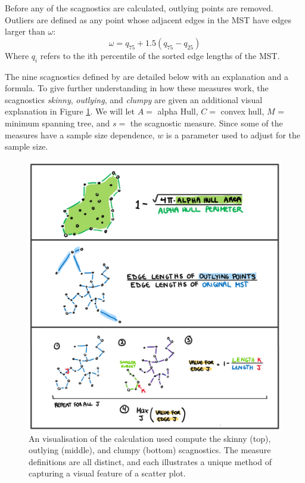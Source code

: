 Before any of the scagnostics are calculated, outlying points are
removed. Outliers are defined as any point whose adjacent edges in the
MST have edges larger than \(\omega\):
\[ \omega = q_{75} + 1.5(q_{75} - q_{25})\] Where \(q_i\) refers to the
ith percentile of the sorted edge lengths of the MST.

The nine scagnostics defined by \citet{scagdist} are detailed below with
an explanation and a formula. To give further understanding in how these
measures work, the scagnostics \emph{skinny}, \emph{outlying}, and
\emph{clumpy} are given an additional visual explanation in Figure
\ref{fig:scagdrawn}. We will let \(A=\) alpha Hull, \(C=\) convex hull,
\(M\) = minimum spanning tree, and \(s=\) the scagnostic measure. Since
some of the measures have a sample size dependence, \(w\) is a parameter
used to adjust for the sample size.

\begin{Schunk}
\begin{figure}
\includegraphics[width=1\linewidth]{figures/drawnmeasures} \caption[ An visualisation of the calculation used compute the skinny (top), outlying (middle), and clumpy (bottom) scagnostics]{ An visualisation of the calculation used compute the skinny (top), outlying (middle), and clumpy (bottom) scagnostics. The measure definitions are all distinct, and each illustrates a unique method of capturing a visual feature of a scatter plot.}\label{fig:scagdrawn}
\end{figure}
\end{Schunk}

